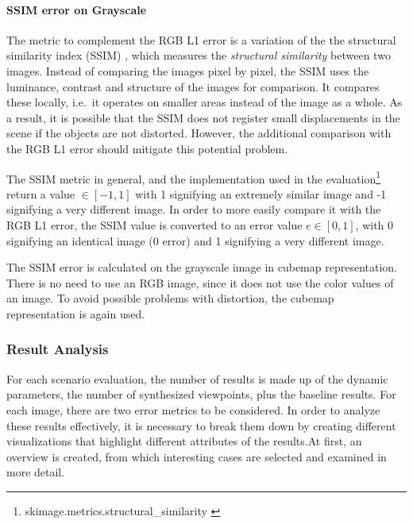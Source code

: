 \paragraph{SSIM error on Grayscale}
The metric to complement the RGB L1 error is a variation of the the structural similarity index (SSIM) \cite{ssim}, which measures the \emph{structural similarity} between two images. Instead of comparing the images pixel by pixel, the SSIM uses the luminance, contrast and structure of the images for comparison. It compares these locally, i.e.\ it operates on smaller areas instead of the image as a whole. As a result, it is possible that the SSIM does not register small displacements in the scene if the objects are not distorted. However, the additional comparison with the RGB L1 error should mitigate this potential problem.

The SSIM metric in general, and the implementation used in the evaluation\footnote{skimage.metrics.structural\_similarity \cite{skimage}} return a value $\in [-1, 1]$ with 1 signifying an extremely similar image and -1 signifying a very different image. In order to more easily compare it with the RGB L1 error, the SSIM value is converted to an error value $ e \in [0,1]$, with 0 signifying an identical image (0 error) and 1 signifying a very different image.

The SSIM error is calculated on the grayscale image in cubemap representation. There is no need to use an RGB image, since it does not use the color values of an image. To avoid possible problems with distortion, the cubemap representation is again used.

\subsubsection{Result Analysis}
For each scenario evaluation, the number of results is made up of the dynamic parameters, the number of synthesized viewpoints, plus the baseline results. For each image, there are two error metrics to be considered.
In order to analyze these results effectively, it is necessary to break them down by creating different visualizations that highlight different attributes of the results.At first, an overview is created, from which interesting cases are selected and examined in more detail.


